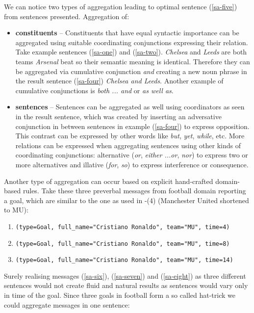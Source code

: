We can notice two types of aggregation leading to optimal sentence (\ref{sa-five}) from sentences presented. Aggregation of:
\begin{itemize}
	\item \textbf{constituents} -- Constituents that have equal syntactic importance can be aggregated using suitable coordinating conjunctions expressing their relation. Take example sentences (\ref{sa-one}) and (\ref{sa-two}). \emph{Chelsea} and \emph{Leeds} are both teams \emph{Arsenal} beat so their semantic meaning is identical. Therefore they can be aggregated via cumulative conjunction \emph{and} creating a new noun phrase in the result sentence (\ref{sa-four}) \emph{Chelsea and Leeds}. Another example of cumulative conjunctions is \emph{both ... and} or \emph{as well as}.
	\item \textbf{sentences} -- Sentences can be aggregated as well using coordinators as seen in the result sentence, which was created by inserting an adversative conjunction in between sentences in example (\ref{sa-four}) to express opposition. This contrast can be expressed by other words like \emph{but}, \emph{yet}, \emph{while}, etc. More relations can be expressed when aggregating sentences using other kinds of coordinating conjunctions: alternative (\emph{or}, \emph{either ...or}, \emph{nor}) to express two or more alternatives and illative (\emph{for}, \emph{so}) to express interference or consequence.
\end{itemize}

Another type of aggregation can occur based on explicit hand-crafted domain-based rules. Take these three preverbal messages from football domain reporting a goal, which are similar to the one as used in -(4) (Manchester United shortened to MU):
\begin{enumerate}[resume]
	\item \texttt{(type=Goal, full\_name="Cristiano Ronaldo", team="MU", time=4)}\label{sa-six}	
	\item \texttt{(type=Goal, full\_name="Cristiano Ronaldo", team="MU", time=8)}\label{sa-seven}
	\item \texttt{(type=Goal, full\_name="Cristiano Ronaldo", team="MU", time=14)}\label{sa-eight}	
\end{enumerate}

Surely realising messages (\ref{sa-six}), (\ref{sa-seven}) and (\ref{sa-eight}) as three different sentences would not create fluid and natural results as sentences would vary only in time of the goal. Since three goals in football form a so called hat-trick we could aggregate messages in one sentence:

